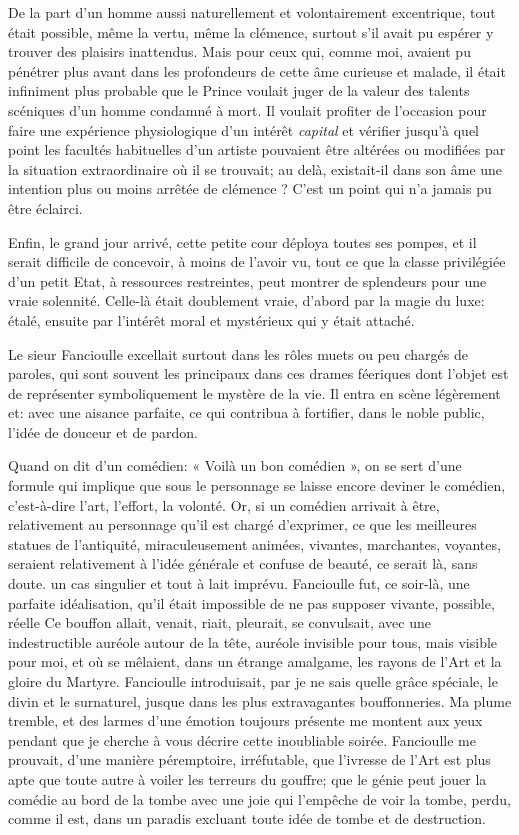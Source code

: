 De la part d’un homme aussi naturellement et
volontairement excentrique, tout était possible, même la vertu, même la
clémence, surtout s’il avait pu espérer y trouver des
plaisirs inattendus. Mais pour ceux qui, comme moi, avaient pu pénétrer
plus avant dans les profondeurs de cette âme curieuse et malade, il
était infiniment plus probable que le Prince voulait juger de la valeur
des talents scéniques d’un homme condamné à mort. Il
voulait profiter de l’occasion pour faire une
expérience physiologique d’un intérêt \textit{capital} et
vérifier jusqu’à quel point les facultés habituelles
d’un artiste pouvaient être altérées ou modifiées par
la situation extraordinaire où il se trouvait; au delà, existait{}-il
dans son âme une intention plus ou moins arrêtée de clémence ?
C’est un point qui n’a jamais pu être
éclairci.

Enfin, le grand jour arrivé, cette petite cour déploya toutes ses
pompes, et il serait difficile de concevoir, à moins de
l’avoir vu, tout ce que la classe privilégiée
d’un petit Etat, à ressources restreintes, peut
montrer de splendeurs pour une vraie solennité. Celle{}-là était
doublement vraie, d’abord par la magie du luxe: étalé,
ensuite par l’intérêt moral et mystérieux qui y était
attaché.

Le sieur Fancioulle excellait surtout dans les rôles muets ou peu
chargés de paroles, qui sont souvent les principaux dans ces drames
féeriques dont l’objet est de représenter
symboliquement le mystère de la vie. Il entra en scène légèrement et:
avec une aisance parfaite, ce qui contribua à fortifier, dans le noble
public, l’idée de douceur et de pardon.

Quand on dit d’un comédien: « Voilà un bon comédien »,
on se sert d’une formule qui implique que sous le
personnage se laisse encore deviner le comédien,
c’est{}-à{}-dire l’art,
l’effort, la volonté. Or, si un comédien arrivait à
être, relativement au personnage qu’il est chargé
d’exprimer, ce que les meilleures statues de
l’antiquité, miraculeusement animées, vivantes,
marchantes, voyantes, seraient relativement à l’idée
générale et confuse de beauté, ce serait là, sans doute. un cas
singulier et tout à lait imprévu. Fancioulle fut, ce soir{}-là, une
parfaite idéalisation, qu’il était impossible de ne
pas supposer vivante, possible, réelle Ce bouffon allait, venait,
riait, pleurait, se convulsait, avec une indestructible auréole autour
de la tête, auréole invisible pour tous, mais visible pour moi, et où
se mêlaient, dans un étrange amalgame, les rayons de
l’Art et la gloire du Martyre. Fancioulle
introduisait, par je ne sais quelle grâce spéciale, le divin et le
surnaturel, jusque dans les plus extravagantes bouffonneries. Ma plume
tremble, et des larmes d’une émotion toujours présente
me montent aux yeux pendant que je cherche à vous décrire cette
inoubliable soirée. Fancioulle me prouvait, d’une
manière péremptoire, irréfutable, que l’ivresse de
l’Art est plus apte que toute autre à voiler les
terreurs du gouffre; que le génie peut jouer la comédie au bord de la
tombe avec une joie qui l’empêche de voir la tombe,
perdu, comme il est, dans un paradis excluant toute idée de tombe et de
destruction.

